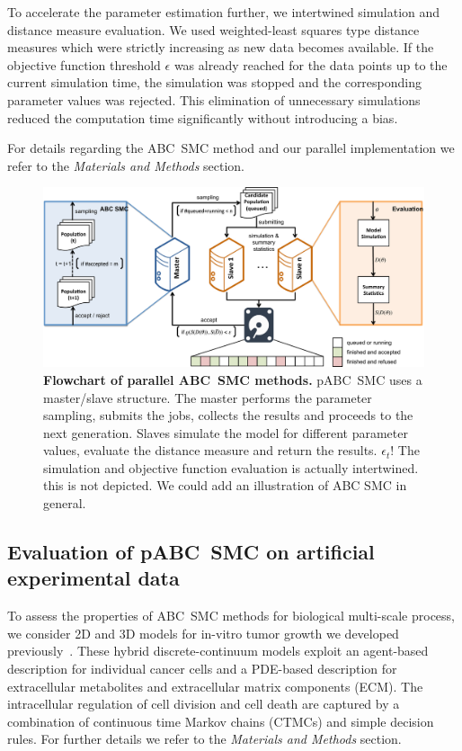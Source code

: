 \documentclass[10pt,letterpaper]{article}
\newcommand{\jh}[1]{{\color{red}#1}}
\begin{document}
To accelerate the parameter estimation further, we intertwined simulation and distance measure evaluation. We used weighted-least squares type distance measures which were strictly increasing as new data becomes available. If the objective function threshold $\epsilon$ was already reached for the data points up to the current simulation time, the simulation was stopped and the corresponding parameter values was rejected. This elimination of unnecessary simulations reduced the computation time significantly without introducing a bias.

For details regarding the ABC~SMC method and our parallel implementation we refer to the \textit{Materials and Methods} section.

\begin{figure}[t]
\includegraphics[width=\textwidth]{Figures/Pipeline.pdf}
\caption{{\bf Flowchart of parallel ABC~SMC methods.}
pABC~SMC uses a master/slave structure. The master performs the parameter sampling, submits the jobs, collects the results and proceeds to the next generation. Slaves simulate the model for different parameter values, evaluate the distance measure and return the results.
\jh{$\epsilon_t$!}
\jh{The simulation and objective function evaluation is actually intertwined. this is not depicted.}
\jh{We could add an illustration of ABC SMC in general.}
}
\label{fig:Pipeline}
\end{figure}

\subsection*{Evaluation of pABC~SMC on artificial experimental data}

To assess the properties of ABC~SMC methods for biological multi-scale process, we consider 2D and 3D models for in-vitro tumor growth we developed previously~\cite{Jagiella2015}. These hybrid discrete-continuum models exploit an agent-based description for individual cancer cells and a PDE-based description for extracellular metabolites and extracellular matrix components (ECM). The intracellular regulation of cell division and cell death are captured by a combination of continuous time Markov chains (CTMCs) and simple decision rules. For further details we refer to the \textit{Materials and Methods} section.
\end{document}
